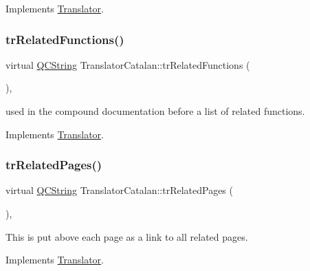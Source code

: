 Implements \mbox{\hyperlink{class_translator}{Translator}}.

\mbox{\label{class_translator_catalan_a685003c5ec19f67456b15a0fdcbbdc0b}} 
\subsubsection{\texorpdfstring{trRelatedFunctions()}{trRelatedFunctions()}}
{\footnotesize\ttfamily virtual \mbox{\hyperlink{class_q_c_string}{Q\+C\+String}} Translator\+Catalan\+::tr\+Related\+Functions (\begin{DoxyParamCaption}{ }\end{DoxyParamCaption})\hspace{0.3cm}{\ttfamily [inline]}, {\ttfamily [virtual]}}

used in the compound documentation before a list of related functions. 

Implements \mbox{\hyperlink{class_translator}{Translator}}.

\mbox{\label{class_translator_catalan_aea1766ff21f0b7bfd2d4a907db9549cc}} 
\subsubsection{\texorpdfstring{trRelatedPages()}{trRelatedPages()}}
{\footnotesize\ttfamily virtual \mbox{\hyperlink{class_q_c_string}{Q\+C\+String}} Translator\+Catalan\+::tr\+Related\+Pages (\begin{DoxyParamCaption}{ }\end{DoxyParamCaption})\hspace{0.3cm}{\ttfamily [inline]}, {\ttfamily [virtual]}}

This is put above each page as a link to all related pages. 

Implements \mbox{\hyperlink{class_translator}{Translator}}.

\mbox{\label{class_translator_catalan_a0132cfece171ef52cbd1d78cf4c572c9}} 
